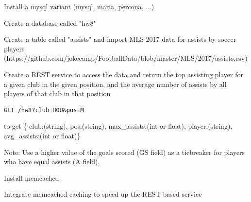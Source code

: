\documentclass[fancy,11pt,titlestyle=display]{style/elegantbook}
\begin{document}
\begin{problemset}
\item Install a mysql variant (mysql, maria, percona, ...)
\item Create a database called "hw8"
\item Create a table called "assists" and import MLS 2017 data for assists by soccer players (https://github.com/jokecamp/FootballData/blob/master/MLS/2017/assists.csv)
\item Create a REST service to access the data and return the top assisting player for a given club in the given position, and the average number of assists by all players of that club in that position
\begin{lstlisting}
GET /hw8?club=HOU&pos=M
\end{lstlisting}
to get \{ club:(string), pos:(string), max\_assists:(int or float), player:(string), avg\_assists:(int or float)\}

Note: Use a higher value of the goals scored (GS field) as a tiebreaker for players who have equal assists (A field).
\item Install memcached
\item Integrate memcached caching to speed up the REST-based service
\end{problemset}
\end{document}

